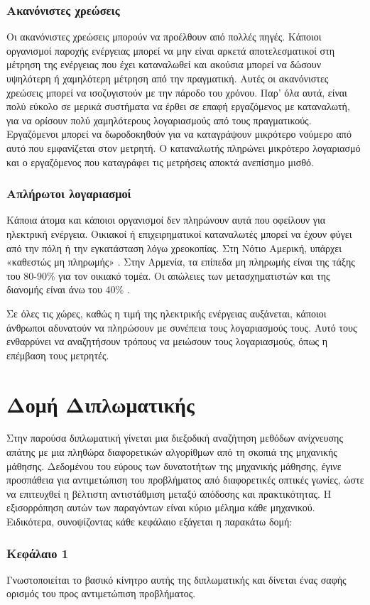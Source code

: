 \subsubsection{Ακανόνιστες χρεώσεις}
Οι ακανόνιστες χρεώσεις μπορούν να προέλθουν από πολλές πηγές. Κάποιοι οργανισμοί παροχής ενέργειας μπορεί να μην είναι αρκετά αποτελεσματικοί στη μέτρηση της ενέργειας που έχει καταναλωθεί και ακούσια μπορεί να δώσουν υψηλότερη ή χαμηλότερη μέτρηση από την πραγματική. Αυτές οι ακανόνιστες χρεώσεις μπορεί να ισοζυγιστούν με την πάροδο του χρόνου. Παρ' όλα αυτά, είναι πολύ εύκολο σε μερικά συστήματα να έρθει σε επαφή εργαζόμενος με καταναλωτή, για να ορίσουν  πολύ χαμηλότερους λογαριασμούς από τους πραγματικούς. Εργαζόμενοι μπορεί να δωροδοκηθούν για να καταγράψουν μικρότερο νούμερο από αυτό που εμφανίζεται στον μετρητή. Ο καταναλωτής πληρώνει μικρότερο λογαριασμό και ο εργαζόμενος που καταγράφει τις μετρήσεις αποκτά ανεπίσημο μισθό.
\subsubsection{Απλήρωτοι λογαριασμοί}
Κάποια άτομα και κάποιοι οργανισμοί δεν πληρώνουν αυτά που οφείλουν για ηλεκτρική ενέργεια. Οικιακοί ή επιχειρηματικοί καταναλωτές  μπορεί να έχουν φύγει από την πόλη ή την εγκατάσταση λόγω χρεοκοπίας. Στη Νότιο Αμερική, υπάρχει «καθεστώς μη πληρωμής» \cite{mkhwanazi}. Στην Αρμενία, τα επίπεδα μη πληρωμής είναι της τάξης του 80-90\% για τον οικιακό τομέα. Οι απώλειες των μετασχηματιστών και της διανομής είναι άνω του 40\% \cite{tacis}.\par
Σε όλες τις χώρες, καθώς η τιμή της ηλεκτρικής ενέργειας αυξάνεται, κάποιοι άνθρωποι αδυνατούν να πληρώσουν με συνέπεια τους λογαριασμούς τους. Αυτό τους ενθαρρύνει να αναζητήσουν τρόπους να μειώσουν τους λογαριασμούς, όπως η επέμβαση τους μετρητές.
\section{Δομή Διπλωματικής}
Στην παρούσα διπλωματική γίνεται μια διεξοδική αναζήτηση μεθόδων ανίχνευσης απάτης με μια πληθώρα διαφορετικών αλγορίθμων από τη σκοπιά της μηχανικής μάθησης. Δεδομένου του εύρους των δυνατοτήτων της μηχανικής μάθησης, έγινε προσπάθεια για αντιμετώπιση του προβλήματος από διαφορετικές οπτικές γωνίες, ώστε να επιτευχθεί η βέλτιστη αντιστάθμιση μεταξύ απόδοσης και πρακτικότητας. Η εξισορρόπηση αυτών των παραγόντων είναι κύριο μέλημα κάθε μηχανικού. Ειδικότερα, συνοψίζοντας κάθε κεφάλαιο εξάγεται η παρακάτω δομή:%
\subsubsection{Κεφάλαιο 1}
Γνωστοποιείται το βασικό κίνητρο αυτής της διπλωματικής και δίνεται ένας σαφής ορισμός του προς αντιμετώπιση προβλήματος.
